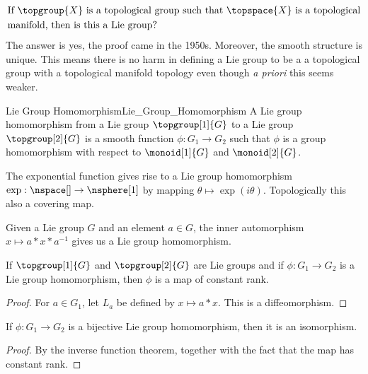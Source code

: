     \begin{equation}
        \begin{split}
            &\text{If }\topgroup{X}
            \text{ is a topological group such that }
            \topspace{X}\text{ is a topological}\\
            &\text{manifold, then is this a Lie group?}
        \end{split}
    \end{equation}
    The answer is yes, the proof came in the 1950s. Moreover, the
    smooth structure is unique. This means there is no harm in defining
    a Lie group to be a a topological group with a topological manifold
    topology even though \textit{a priori} this seems weaker.
    \begin{fdefinition}{Lie Group Homomorphism}{Lie_Group_Homomorphism}
        A Lie group homomorphism from a Lie group
        $\topgroup[1]{G}$ to a Lie group $\topgroup[2]{G}$ is a smooth
        function $\phi:G_{1}\rightarrow{G}_{2}$ such that $\phi$ is a
        group homomorphism with respect to $\monoid[1]{G}$ and
        $\monoid[2]{G}$.
    \end{fdefinition}
    \begin{example}
        The exponential function gives rise to a Lie group homomorphism
        $\exp:\nspace[]\rightarrow\nsphere[1]$ by mapping
        $\theta\mapsto\exp(i\theta)$. Topologically this also a covering
        map.
    \end{example}
    \begin{example}
        Given a Lie group $G$ and an element $a\in{G}$, the inner
        automorphism $x\mapsto{a}*x*a^{\minus{1}}$ gives us a Lie group
        homomorphism.
    \end{example}
    \begin{theorem}
        If $\topgroup[1]{G}$ and $\topgroup[2]{G}$ are Lie groups and if
        $\phi:G_{1}\rightarrow{G}_{2}$ is a Lie group homomorphism, then
        $\phi$ is a map of constant rank.
    \end{theorem}
    \begin{proof}
        For $a\in{G}_{1}$, let $L_{a}$ be defined by $x\mapsto{a}*x$.
        This is a diffeomorphism.
    \end{proof}
    \begin{theorem}
        If $\phi:G_{1}\rightarrow{G}_{2}$ is a bijective Lie group
        homomorphism, then it is an isomorphism.
    \end{theorem}
    \begin{proof}
        By the inverse function theorem, together with the fact that the
        map has constant rank.
    \end{proof}

